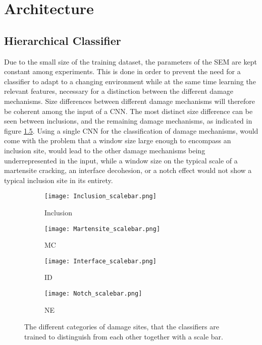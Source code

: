 \chapter{Architecture}

\label{cha:Architecture}

\section{Hierarchical Classifier}
Due to the small size of the training dataset, the parameters of the SEM are kept constant among experiments. This is done in order to prevent the need for a classifier to adapt to a changing environment while at the same time learning the relevant features, necessary for a distinction between the different damage mechanisms. Size differences between different damage mechanisms will therefore be coherent among the input of a CNN. The most distinct size difference can be seen between inclusions, and the remaining damage mechanisms, as indicated in figure \ref{fig:SizeDifference}. Using a single CNN for the classification of damage mechanisms, would come with the problem that a window size large enough to encompass an inclusion site, would lead to the other damage mechanisms being underrepresented in the input, while a window size on the typical scale of a martensite cracking, an interface decohesion, or a notch effect would not show a typical inclusion site in its entirety. \\

\begin{figure}[H]
\centering
\begin{subfigure}{.25\textwidth}
\centering
  \texttt{[image: Inclusion\_scalebar.png]}
  \caption{Inclusion}
  \label{fig:Inclusion_scalebar}
\end{subfigure}%
\begin{subfigure}{.25\textwidth}
\centering
  \texttt{[image: Martensite\_scalebar.png]}
  \caption{MC}
  \label{fig:Martensite_scalebar}
\end{subfigure}%
\begin{subfigure}{.25\textwidth}
\centering
  \texttt{[image: Interface\_scalebar.png]}
  \caption{ID}
  \label{fig:Interface_scalebar}
\end{subfigure}%
\begin{subfigure}{.25\textwidth}
\centering
  \texttt{[image: Notch\_scalebar.png]}
  \caption{NE}
  \label{fig:Notch_scalebar}
\end{subfigure}%
\caption{The different categories of damage sites, that the classifiers are trained to distinguish from each other together with a scale bar.}
\label{fig:SizeDifference}
\end{figure}

